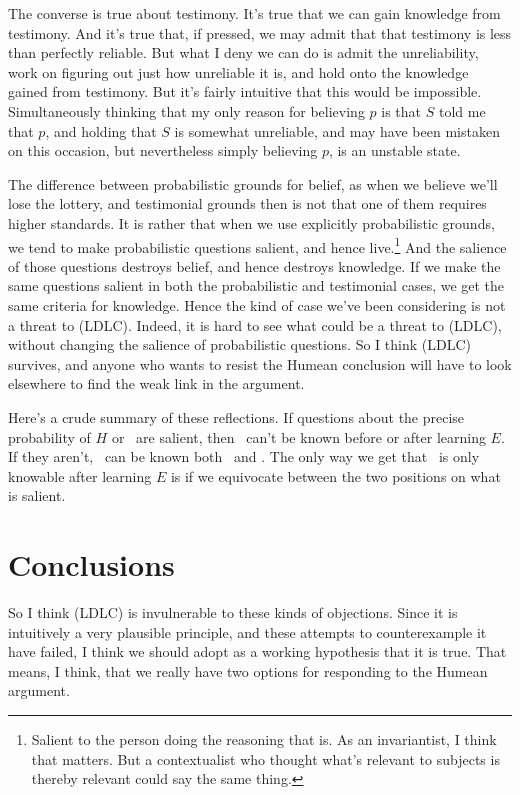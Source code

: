 The converse is true about testimony. It's true that we can gain knowledge from testimony. And it's true that, if pressed, we may admit that that testimony is less than perfectly reliable. But what I deny we can do is admit the unreliability, work on figuring out just how unreliable it is, and hold onto the knowledge gained from testimony. But it's fairly intuitive that this would be impossible. Simultaneously thinking that my only reason for believing $p$ is that $S$ told me that $p$, and holding that $S$ is somewhat unreliable, and may have been mistaken on this occasion, but nevertheless simply believing $p$, is an unstable state.

The difference between probabilistic grounds for belief, as when we believe we'll lose the lottery, and testimonial grounds then is not that one of them requires higher standards. It is rather that when we use explicitly probabilistic grounds, we tend to make probabilistic questions salient, and hence live.\footnote{Salient to the person doing the reasoning that is. As an invariantist, I think that matters. But a contextualist who thought what's relevant to subjects is thereby relevant could say the same thing.} And the salience of those questions destroys belief, and hence destroys knowledge. If we make the same questions salient in both the probabilistic and testimonial cases, we get the same criteria for knowledge. Hence the kind of case we've been considering is not a threat to (LDLC). Indeed, it is hard to see what could be a threat to (LDLC), without changing the salience of probabilistic questions. So I think (LDLC) survives, and anyone who wants to resist the Humean conclusion will have to look elsewhere to find the weak link in the argument.

Here's a crude summary of these reflections. If questions about the precise probability of $H$ or \ECH\ are salient, then \ECH\ can't be known before or after learning $E$. If they aren't, \ECH\ can be known both \apr\ and \apo. The only way we get that \ECH\ is only knowable after learning $E$  is if we equivocate between the two positions on what is salient.

\section{Conclusions}
So I think (LDLC) is invulnerable to these kinds of objections. Since it is intuitively a very plausible principle, and these attempts to counterexample it have failed, I think we should adopt as a working hypothesis that it is true. That means, I think, that we really have two options for responding to the Humean argument.

